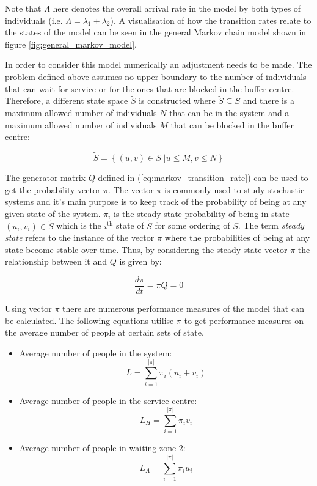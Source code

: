 Note that \(\Lambda\) here denotes the overall arrival rate in the model by both 
types of individuals (i.e. \(\Lambda = \lambda_1 + \lambda_2\)). 
A visualisation of how the transition rates relate to the states of the model 
can be seen in the general Markov chain model shown in figure 
\ref{fig:general_markov_model}.




In order to consider this model numerically an adjustment needs to be made. 
The problem defined above assumes no upper boundary to the number of individuals 
that can wait for service or for the ones that are blocked in the buffer centre. 
Therefore, a different state space \( \tilde S \) is constructed where 
\( \tilde S \subseteq S \) and there is a maximum allowed number of individuals 
\(N\) that can be in the system and a maximum allowed number of individuals 
\(M\) that can be blocked in the buffer centre:

\begin{equation}
    \tilde S = \left\{ (u, v) \in S\;| u \leq M, v\leq N \right\}
\end{equation}


The generator matrix \( Q \) defined in (\ref{eq:markov_transition_rate}) can 
be used to get the probability vector \( \pi \).
The vector \( \pi \) is commonly used to study stochastic systems and it's main
purpose is to keep track of the probability of being at any given state of 
the system. 
\(\pi_i\) is the steady state probability of being in state \((u_i, v_i) \in 
\tilde S\) which is the \(i^{\text{th}}\) state of \(\tilde S\) for some ordering of 
\(\tilde S\).
The term \textit{steady state} refers to the instance of the vector \( \pi \) 
where the probabilities of being at any state become stable over time. 
Thus, by considering the steady state vector \( \pi \) the relationship between 
it and \( Q \) is given by:

\[
    \frac{d\pi}{dt} = \pi Q = 0
\]

Using vector \(\pi\) there are numerous performance measures of the model that 
can be calculated. 
The following equations utilise \(\pi\) to get performance measures on the 
average number of people at certain sets of state.

\begin{itemize}
    \item Average number of people in the system: 
        \[L = \sum_{i=1}^{|\pi|} \pi_i (u_i + v_i)\]
    \item Average number of people in the service centre: 
        \[L_H = \sum_{i=1}^{|\pi|} \pi_i v_i\]
    \item Average number of people in waiting zone 2:
        \[L_A = \sum_{i=1}^{|\pi|} \pi_i u_i\] 
\end{itemize}

